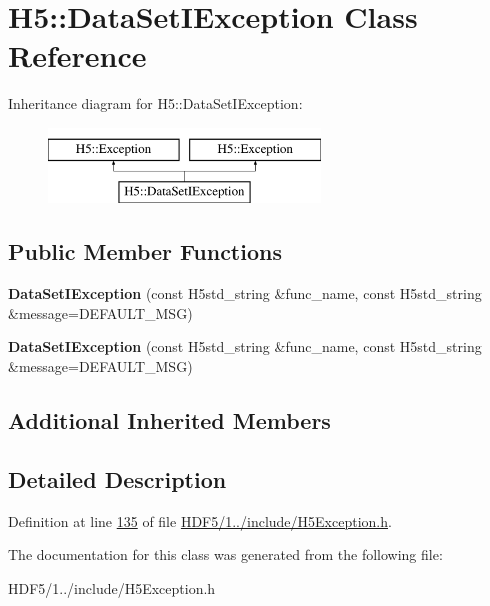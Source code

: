 \hypertarget{class_h5_1_1_data_set_i_exception}{}\section{H5\+:\+:Data\+Set\+I\+Exception Class Reference}
\label{class_h5_1_1_data_set_i_exception}
Inheritance diagram for H5\+:\+:Data\+Set\+I\+Exception\+:\begin{figure}[H]
\begin{center}
\leavevmode
\includegraphics[height=2.000000cm]{class_h5_1_1_data_set_i_exception}
\end{center}
\end{figure}
\subsection*{Public Member Functions}
\begin{DoxyCompactItemize}
\item 
\mbox{\label{class_h5_1_1_data_set_i_exception_a8156d2151113bbb422fe627f881ac2d7}} 
{\bfseries Data\+Set\+I\+Exception} (const H5std\+\_\+string \&func\+\_\+name, const H5std\+\_\+string \&message=D\+E\+F\+A\+U\+L\+T\+\_\+\+M\+SG)
\item 
\mbox{\label{class_h5_1_1_data_set_i_exception_a8156d2151113bbb422fe627f881ac2d7}} 
{\bfseries Data\+Set\+I\+Exception} (const H5std\+\_\+string \&func\+\_\+name, const H5std\+\_\+string \&message=D\+E\+F\+A\+U\+L\+T\+\_\+\+M\+SG)
\end{DoxyCompactItemize}
\subsection*{Additional Inherited Members}


\subsection{Detailed Description}


Definition at line \hyperlink{_h_d_f5_21_810_81_2include_2_h5_exception_8h_source_l00135}{135} of file \hyperlink{_h_d_f5_21_810_81_2include_2_h5_exception_8h_source}{H\+D\+F5/1../include/\+H5\+Exception.\+h}.



The documentation for this class was generated from the following file\+:\begin{DoxyCompactItemize}
\item 
H\+D\+F5/1../include/\+H5\+Exception.\+h\end{DoxyCompactItemize}
